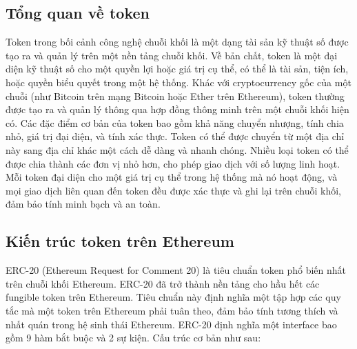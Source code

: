 \subsection{Tổng quan về token}
\hspace{1cm}Token trong bối cảnh công nghệ chuỗi khối là một dạng tài sản kỹ
thuật số
được tạo ra và quản lý trên một nền tảng chuỗi khối. Về bản chất, token là một
đại diện kỹ thuật số cho một quyền lợi hoặc giá trị cụ thể, có thể là tài sản,
tiện ích, hoặc quyền biểu quyết trong một hệ thống. Khác với cryptocurrency gốc
của một chuỗi (như Bitcoin trên mạng Bitcoin hoặc Ether trên Ethereum),
token thường được tạo ra và quản lý thông qua hợp đồng thông minh trên một
chuỗi khối hiện có. Các đặc điểm cơ bản của token bao gồm khả năng chuyển
nhượng, tính chia nhỏ, giá trị đại diện, và tính xác thực. Token có thể được
chuyển từ một địa chỉ này sang địa chỉ khác một cách dễ dàng và nhanh chóng.
Nhiều loại token có thể được chia thành các đơn vị nhỏ hơn, cho phép giao dịch
với số lượng linh hoạt. Mỗi token đại diện cho một giá trị cụ thể trong hệ
thống mà nó hoạt động, và mọi giao dịch liên quan đến token đều được xác thực
và ghi lại trên chuỗi khối, đảm bảo tính minh bạch và an toàn.

\subsection{Kiến trúc token trên Ethereum}
\hspace{1cm}ERC-20 (Ethereum Request for Comment 20) \cite{ERC20} là tiêu chuẩn
token phổ biến nhất trên chuỗi khối Ethereum. ERC-20 đã trở thành nền tảng cho
hầu hết các fungible token trên Ethereum. Tiêu chuẩn này định nghĩa một tập hợp
các quy tắc mà một token trên Ethereum phải tuân theo, đảm bảo tính tương thích
và nhất quán trong hệ sinh thái Ethereum. ERC-20 định nghĩa một interface bao
gồm 9 hàm bắt buộc và 2 sự kiện. Cấu trúc cơ bản như sau:


